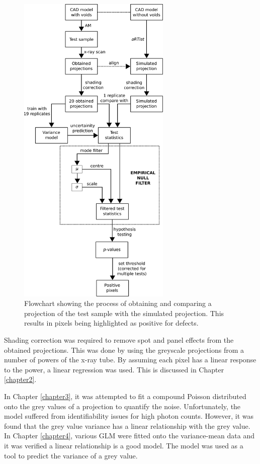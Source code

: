 \documentclass[12pt, a4paper]{memoir}
\begin{document}
\begin{figure}
  \centering
  \includegraphics[width=0.65\textwidth]{../figures/flowchart.pdf}
  \caption{Flowchart showing the process of obtaining and comparing a projection of the test sample with the simulated projection. This results in pixels being highlighted as positive for defects.}
  \label{fig:evaluation_flowchart}
\end{figure}

Shading correction was required to remove spot and panel effects from the obtained projections. This was done by using the greyscale projections from a number of powers of the x-ray tube. By assuming each pixel has a linear response to the power, a linear regression was used. This is discussed in Chapter \ref{chapter2}.

In Chapter \ref{chapter3}, it was attempted to fit a compound Poisson distributed onto the grey values of a projection to quantify the noise. Unfortunately, the model suffered from identifiability issues for high photon counts. However, it was found that the grey value variance has a linear relationship with the grey value. In Chapter \ref{chapter4}, various GLM were fitted onto the variance-mean data and it was verified a linear relationship is a good model. The model was used as a tool to predict the variance of a grey value.
\end{document}
